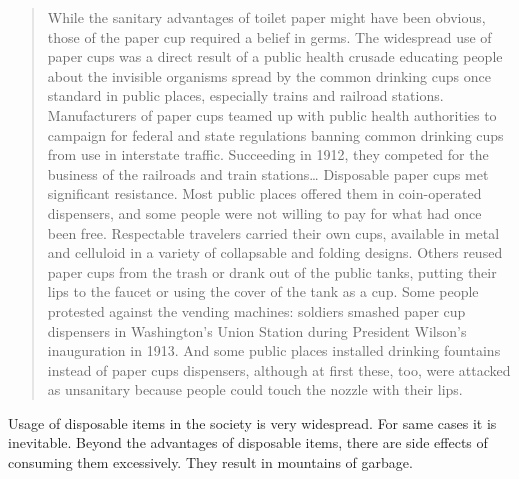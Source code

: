 
 


\begin{quote}
While the sanitary advantages of toilet paper might have been obvious, those of the paper cup required a belief in germs. The widespread use of paper cups was a direct result of a public health crusade educating people about the invisible organisms spread by the common drinking cups once standard in public places, especially trains and railroad stations. Manufacturers of paper cups teamed up with public health authorities to campaign for federal and state regulations banning common drinking cups from use in interstate traffic. Succeeding in 1912, they competed for the business of the railroads and train stations\ldots
Disposable paper cups met significant resistance. Most public places offered them in coin-operated dispensers, and some people were not willing to pay for what had once been free. Respectable travelers carried their own cups, available in metal and celluloid in a variety of collapsable and folding designs. Others reused paper cups from the trash or drank out of the public tanks, putting their lips to the faucet or using the cover of the tank as a cup. Some people protested against the vending machines: soldiers smashed paper cup dispensers in Washington’s Union Station during President Wilson’s inauguration in 1913. And some public places installed drinking fountains instead of paper cups dispensers, although at first these, too, were attacked as unsanitary because people could touch the nozzle with their lips.
\end{quote}

Usage of disposable items in the society is very widespread. For same cases it is inevitable. Beyond the advantages of disposable items, there are side effects of consuming them excessively. They result in mountains of garbage.

